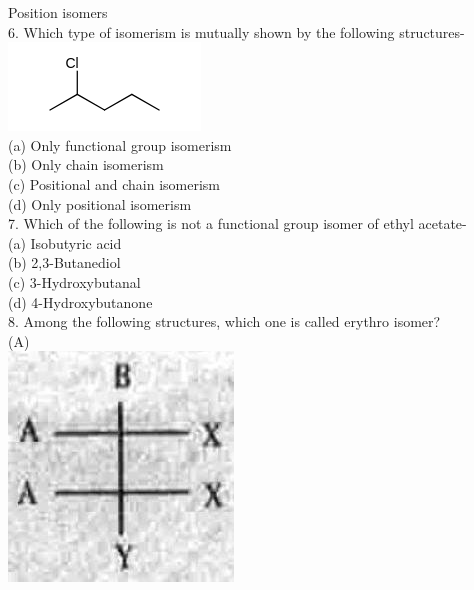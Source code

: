 \documentclass[10pt]{article}
\begin{document}
Position isomers\\
6. Which type of isomerism is mutually shown by the following structures-\\
\includegraphics{smile-9a1a2f6d3b0f57b1947efbdf51d8248faa2dcb50}\\
(a) Only functional group isomerism\\
(b) Only chain isomerism\\
(c) Positional and chain isomerism\\
(d) Only positional isomerism\\
7. Which of the following is not a functional group isomer of ethyl acetate-\\
(a) Isobutyric acid\\
(b) 2,3-Butanediol\\
(c) 3-Hydroxybutanal\\
(d) 4-Hydroxybutanone\\
8. Among the following structures, which one is called erythro isomer?\\
(A)\\
\includegraphics[max width=\textwidth, center]{2025_01_28_8470952b98110cec3aabg-064}\\
\end{document}
